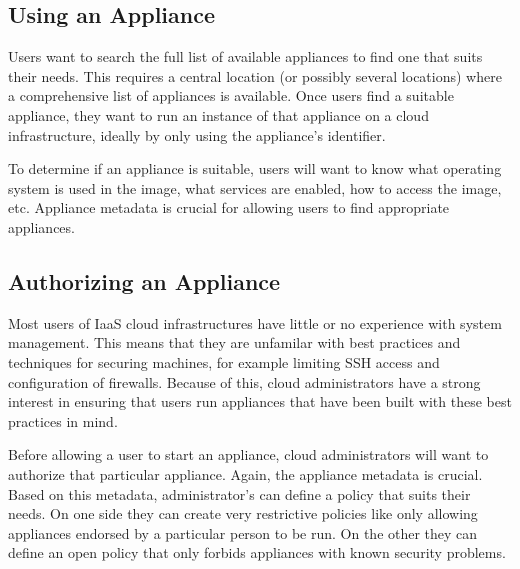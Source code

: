 \subsection{Using an Appliance}

Users want to search the full list of available appliances to find one
that suits their needs.  This requires a central location (or possibly
several locations) where a comprehensive list of appliances is
available.  Once users find a suitable appliance, they want to run an
instance of that appliance on a cloud infrastructure, ideally by only
using the appliance's identifier.

To determine if an appliance is suitable, users will want to know what
operating system is used in the image, what services are enabled, how
to access the image, etc.  Appliance metadata is crucial for allowing
users to find appropriate appliances. 

\subsection{Authorizing an Appliance}

Most users of IaaS cloud infrastructures have little or no experience
with system management.  This means that they are unfamilar with best
practices and techniques for securing machines, for example limiting
SSH access and configuration of firewalls.  Because of this, cloud
administrators have a strong interest in ensuring that users run
appliances that have been built with these best practices in mind.

Before allowing a user to start an appliance, cloud administrators
will want to authorize that particular appliance.  Again, the
appliance metadata is crucial.  Based on this metadata,
administrator's can define a policy that suits their needs.  On one
side they can create very restrictive policies like only allowing
appliances endorsed by a particular person to be run.  On the other
they can define an open policy that only forbids appliances with known
security problems.
